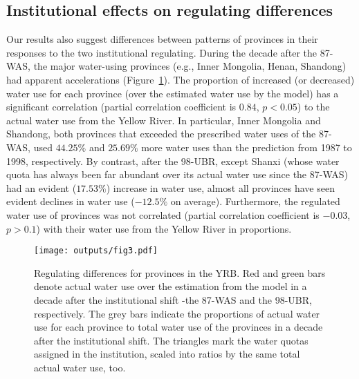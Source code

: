 \subsection{Institutional effects on regulating differences}
\label{result-3}
Our results also suggest differences between patterns of provinces in their responses to the two institutional regulating.
During the decade after the 87-WAS, the major water-using provinces (e.g., Inner Mongolia, Henan, Shandong) had apparent accelerations (Figure~\ref{regulating}).
The proportion of increased (or decreased) water use for each province (over the estimated water use by the model) has a significant correlation (partial correlation coefficient is $0.84$, $p<0.05$) to the actual water use from the Yellow River.
In particular, Inner Mongolia and Shandong, both provinces that exceeded the prescribed water uses of the 87-WAS, used $44.25\%$ and $25.69\%$ more water uses than the prediction from 1987 to 1998, respectively.
By contrast, after the 98-UBR, except Shanxi (whose water quota has always been far abundant over its actual water use since the 87-WAS) had an evident ($17.53\%$) increase in water use, almost all provinces have seen evident declines in water use ($-12.5\%$ on average).
Furthermore, the regulated water use of provinces was not correlated (partial correlation coefficient is $-0.03$, $p>0.1$) with their water use from the Yellow River in proportions.

\begin{figure*}[!tb]
    \centering
    \texttt{[image: outputs/fig3.pdf]}
    \caption{
        Regulating differences for provinces in the YRB.
        Red and green bars denote actual water use over the estimation from the model in a decade after the institutional shift -the 87-WAS and the 98-UBR, respectively.
        The grey bars indicate the proportions of actual water use for each province to total water use of the provinces in a decade after the institutional shift.
        The triangles mark the water quotas assigned in the institution, scaled into ratios by the same total actual water use, too.
    }
    \label{regulating}
\end{figure*}
